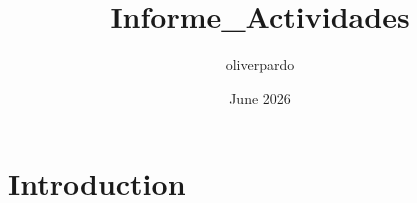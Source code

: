 \documentclass{article}
\title{Informe_Actividades}
\author{oliverpardo }
\date{June 2026}
\begin{document}
\maketitle

\section{Introduction}
\end{document}
